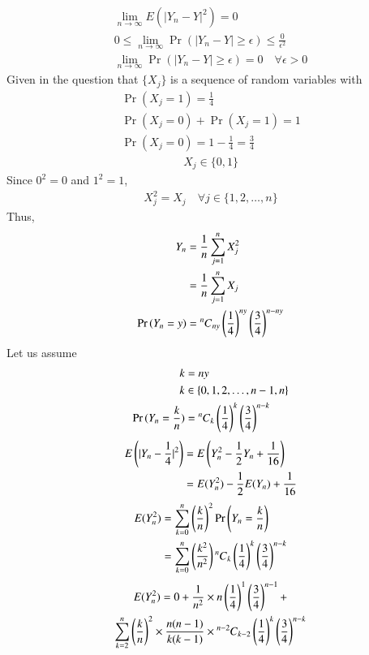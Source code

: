 \documentclass[journal,12pt,twocolumn]{IEEEtran}
\begin{document}
\begin{align}
    \lim_{n\rightarrow \infty} E(|Y_n-Y|^2) = 0 
    \\0 \leq  \lim_{n\rightarrow \infty}\Pr{(|Y_n-Y|\geq \epsilon)}  \leq \frac{0}{\epsilon^2}
    \\   \lim_{n\rightarrow \infty}\Pr{(|Y_n-Y|\geq \epsilon)} = 0 \quad \forall \epsilon >0
\end{align}
Given in the question that $\{X_j\}$ is a sequence of random variables with
\begin{align}
    \Pr{(X_j=1)} = \frac{1}{4}
    \\\Pr{(X_j=0)} + \Pr{(X_j=1)} = 1
    \\\Pr{(X_j=0)} = 1 - \frac{1}{4} = \frac{3}{4}
\end{align}
\begin{align}
    X_j \in \{0,1\} 
\end{align}
Since $0^2 = 0$ and $1^2 = 1$, 
\begin{align}
    X_j^2 = X_j \quad \forall j \in \{1, 2,\hdots, n\}
\end{align}
Thus, 
\begin{align}
    Y_n &= \frac{1}{n} \sum_{j=1}^{n}X_j^2 
    \\&= \frac{1}{n} \sum_{j=1}^{n}X_j
    \\\Pr{(Y_n = y)} &= \comb[n]{ny} \brak{\frac{1}{4}}^{ny} \brak{\frac{3}{4}}^{n-ny}
\end{align}
Let us assume
\begin{align}
    k &= ny
    \\k &\in \{0,1,2,\hdots,n-1,n\}
    \\ \Pr{(Y_n = \frac{k}{n})} &= \comb[n]{k} \brak{\frac{1}{4}}^{k} \brak{\frac{3}{4}}^{n-k}
\end{align}
\begin{align}
    E\brak{\lvert Y_n-\frac{1}{4}\rvert^2} &= E\brak{Y_n^2 - \frac{1}{2}Y_n + \frac{1}{16}}
    \\&= E(Y_n^2) - \frac{1}{2}E(Y_n) + \frac{1}{16} \label{equation 0}
\end{align}
\begin{align}
    E(Y_n^2) &= \sum_{k=0}^n\brak{\frac{k}{n}}^2\Pr{\brak{Y_n=\frac{k}{n}}}
    \\&= \sum_{k=0}^{n} \brak{\frac{k^2}{n^2}}\comb[n]{k} \brak{\frac{1}{4}}^{k} \brak{\frac{3}{4}}^{n-k}
\end{align}
\begin{multline}
    E(Y_n^2) = 0 + \frac{1}{n^2}\times n\brak{\frac{1}{4}}^{1} \brak{\frac{3}{4}}^{n-1} + \\\sum_{k=2}^{n} \brak{\frac{k}{n}}^2\times\frac{n(n-1)}{k(k-1)}
    \times\comb[n-2]{k-2}\brak{\frac{1}{4}}^{k} \brak{\frac{3}{4}}^{n-k}
\end{multline}
\end{document}
